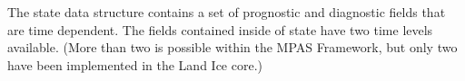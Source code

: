 The state data structure contains a set of prognostic and diagnostic fields
that are time dependent. The fields contained inside of state have two time
levels available.  (More than two is possible within the MPAS Framework, but 
only two have been implemented in the Land Ice core.)
